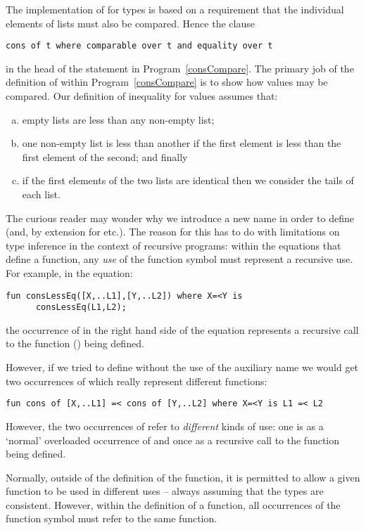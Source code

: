 \begin{aside}
The implementation of  for  types is based on a requirement that the individual elements of lists must also be compared. Hence the clause
\begin{lstlisting}
cons of t where comparable over t and equality over t
\end{lstlisting}
in the head of the   statement in Program~\vref{consCompare}. The primary job of the definition of \q{<} within Program~\vref{consCompare} is to show how  values may be compared. Our definition of inequality for  values assumes that:
\begin{enumerate}[a.]
\item empty lists are less than any non-empty list;
\item one non-empty list is less than another if the first element is less than the first element of the second; and finally
\item if the first elements of the two lists are identical then we consider the tails of each list.
\end{enumerate}
\begin{aside}
The curious reader may wonder why we introduce a new name  in order to define \q{=<} (and, by extension  for \q{<} etc.). The reason for this has to do with limitations on type inference in the context of recursive programs: within the equations that define a function, any \emph{use} of the function symbol must represent a recursive use. For example, in the equation:
\begin{lstlisting}
fun consLessEq([X,..L1],[Y,..L2]) where X=<Y is
      consLessEq(L1,L2);
\end{lstlisting}
the occurrence of  in the right hand side of the equation represents a recursive call to the function () being defined.

However, if we tried to define \q{=<} without the use of the auxiliary name we would get two occurrences of \q{=<} which really represent different functions:
\begin{lstlisting}
fun cons of [X,..L1] =< cons of [Y,..L2] where X=<Y is L1 =< L2
\end{lstlisting}
However, the two occurrences of \q{=<} refer to \emph{different} kinds of use: one is as a `normal' overloaded occurrence of \q{=<} and once as a recursive call to the function being defined.

Normally, outside of the definition of the function, it is permitted to allow a given function to be used in different uses -- always assuming that the types are consistent. However, within the definition of a function, all occurrences of the function symbol must refer to the same function.


\end{aside}
\end{aside}
